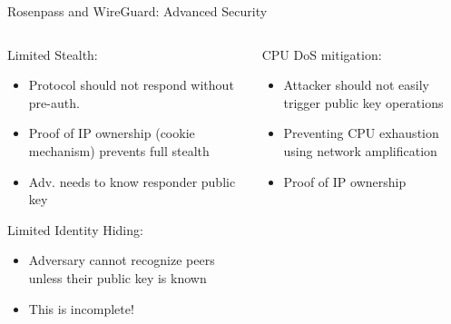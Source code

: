 \begin{frame}{Rosenpass and WireGuard: Advanced Security}
\vspace{-\ht\strutbox}
\begin{columns}[fullwidth,T]
  \begin{column}{.49\linewidth}
  \begin{block}{Limited Stealth:\strut}
    \begin{itemize}
      \item Protocol should not respond without pre-auth.
      \item Proof of IP ownership (cookie mechanism) prevents full stealth
      \item Adv. needs to know responder public key
    \end{itemize}
    \end{block}

    \begin{block}{Limited Identity Hiding:\strut}
    \begin{itemize}
      \item Adversary cannot recognize peers unless their public key is known
      \item This is incomplete!
    \end{itemize}
    \end{block}
  \end{column}

  \begin{column}{.49\linewidth}
    \begin{block}{CPU DoS mitigation:\strut}
    \begin{itemize}
      \item Attacker should not easily trigger public key operations
      \item Preventing CPU exhaustion using network amplification
      \item Proof of IP ownership
    \end{itemize}
    \end{block}

  \end{column}
\end{columns}
\end{frame}

